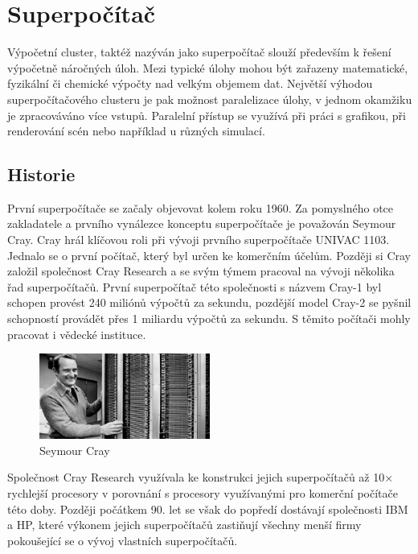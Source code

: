 \chapter{Superpočítač}
Výpočetní cluster, taktéž nazýván jako superpočítač slouží především k řešení výpočetně náročných úloh. Mezi typické úlohy mohou být zařazeny matematické, fyzikální či chemické výpočty nad velkým objemem dat. Největší výhodou superpočítačového clusteru je pak možnost paralelizace úlohy, v jednom okamžiku je zpracováváno více vstupů. Paralelní přístup se využívá při práci s grafikou, při renderování scén nebo například u různých simulací.

\section{Historie}
První superpočítače se začaly objevovat kolem roku 1960. Za pomyslného otce zakladatele a prvního vynálezce konceptu superpočítače je považován Seymour Cray. Cray hrál klíčovou roli při vývoji prvního superpočítače UNIVAC 1103. Jednalo se o první počítač, který byl určen ke komerčním účelům. Později si Cray založil společnost Cray Research a se svým týmem pracoval na vývoji několika řad superpočítačů. První superpočítač této společnosti s názvem Cray-1 byl schopen provést 240 miliónů výpočtů za sekundu, pozdější model Cray-2 se pyšnil schopností provádět přes 1 miliardu výpočtů za sekundu. S těmito počítači mohly pracovat i vědecké instituce.\cite{E1JpczXW0qh9e98N}

\begin{figure}
	\centering
	\includegraphics[width=0.5\textwidth]{Figures/seymour-cray.jpg}
	\caption{Seymour Cray \cite{Tronner20150626}}
	\label{fig:WritingThesis}
\end{figure}

Společnost Cray Research využívala ke konstrukci jejich superpočítačů až 10× rychlejší procesory v porovnání s procesory využívanými pro komerční počítače této doby. Později počátkem 90. let se však do popředí dostávají společnosti IBM a HP, které výkonem jejich superpočítačů zastiňují všechny menší firmy pokoušející se o vývoj vlastních superpočítačů.

